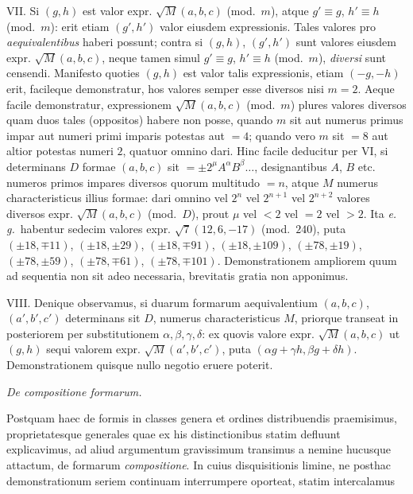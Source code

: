VII. Si $(g,h)$ est valor expr. $\surd M(a,b,c)$ (mod.\ $m$), atque $g'\equiv g$, $h'\equiv h$ (mod.\ $m$): erit etiam $(g',h')$ valor eiusdem expressionis. Tales valores pro \textit{aequivalentibus} haberi possunt; contra si $(g,h)$, $(g',h')$ sunt valores eiusdem expr. $\surd M(a,b,c)$, neque tamen simul $g'\equiv g$, $h'\equiv h$ (mod.\ $m$), \textit{diversi} sunt censendi. Manifesto quoties $(g,h)$ est valor talis expressionis, etiam $(-g,-h)$ erit, facileque demonstratur, hos valores semper esse diversos nisi $m=2$. Aeque facile demonstratur, expressionem $\surd M(a,b,c)$ (mod.\ $m$) plures valores diversos quam duos tales (oppositos) habere non posse, quando $m$ sit aut numerus primus impar aut numeri primi imparis potestas aut $=4$; quando vero $m$ sit $=8$ aut altior potestas numeri $2$, quatuor omnino dari. Hinc facile deducitur per VI, si determinans $D$ formae $(a,b,c)$ sit $=\pm2^\mu A^\alpha B^\beta\ldots$, designantibus $A$, $B$ etc. numeros primos impares diversos quorum multitudo $=n$, atque $M$ numerus characteristicus illius formae: dari omnino vel $2^n$ vel $2^{n+1}$ vel $2^{n+2}$ valores diversos expr. $\surd M(a,b,c)$ (mod.\ $D$), prout $\mu$ vel $<2$ vel $=2$ vel $>2$. Ita \textit{e. g.}\ habentur sedecim valores expr. $\surd7(12,6,-17)$ (mod.\ $240$), puta $(\pm18,\mp11)$, $(\pm18,\pm29)$, $(\pm18,\mp91)$, $(\pm18,\pm109)$, $(\pm78,\pm19)$, $(\pm78,\pm59)$, $(\pm78,\mp61)$, $(\pm78,\mp101)$. Demonstrationem ampliorem quum ad sequentia non sit adeo necessaria, brevitatis gratia non apponimus.

VIII. Denique observamus, si duarum formarum aequivalentium $(a,b,c)$, $(a',b',c')$ determinans sit $D$, numerus characteristicus $M$, priorque transeat in posteriorem per substitutionem $\alpha,\beta,\gamma,\delta$: ex quovis valore expr. $\surd M(a,b,c)$ ut $(g,h)$ sequi valorem expr. $\surd M(a',b',c')$, puta $(\alpha g+\gamma h,\beta g+\delta h)$. Demonstrationem quisque nullo negotio eruere poterit.

\begin{center}
\textit{De compositione formarum.}
\end{center}

Postquam haec de formis in classes genera et ordines distribuendis praemisimus, proprietatesque generales quae ex his distinctionibus statim defluunt explicavimus, ad aliud argumentum gravissimum transimus a nemine hucusque
attactum, de formarum \textit{compositione}. In cuius disquisitionis limine, ne posthac demonstrationum seriem continuam interrumpere oporteat, statim intercalamus

